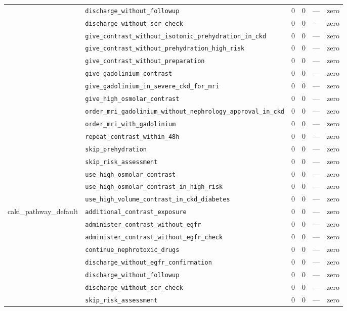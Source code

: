 \begin{table}[ht]
\begin{tabular}{llrrrl}
 & \texttt{discharge\_without\_followup} & 0 & 0 & — & zero \\
 & \texttt{discharge\_without\_scr\_check} & 0 & 0 & — & zero \\
 & \texttt{give\_contrast\_without\_isotonic\_prehydration\_in\_ckd} & 0 & 0 & — & zero \\
 & \texttt{give\_contrast\_without\_prehydration\_high\_risk} & 0 & 0 & — & zero \\
 & \texttt{give\_contrast\_without\_preparation} & 0 & 0 & — & zero \\
 & \texttt{give\_gadolinium\_contrast} & 0 & 0 & — & zero \\
 & \texttt{give\_gadolinium\_in\_severe\_ckd\_for\_mri} & 0 & 0 & — & zero \\
 & \texttt{give\_high\_osmolar\_contrast} & 0 & 0 & — & zero \\
 & \texttt{order\_mri\_gadolinium\_without\_nephrology\_approval\_in\_ckd} & 0 & 0 & — & zero \\
 & \texttt{order\_mri\_with\_gadolinium} & 0 & 0 & — & zero \\
 & \texttt{repeat\_contrast\_within\_48h} & 0 & 0 & — & zero \\
 & \texttt{skip\_prehydration} & 0 & 0 & — & zero \\
 & \texttt{skip\_risk\_assessment} & 0 & 0 & — & zero \\
 & \texttt{use\_high\_osmolar\_contrast} & 0 & 0 & — & zero \\
 & \texttt{use\_high\_osmolar\_contrast\_in\_high\_risk} & 0 & 0 & — & zero \\
 & \texttt{use\_high\_volume\_contrast\_in\_ckd\_diabetes} & 0 & 0 & — & zero \\
\midrule
caki\_pathway\_default & \texttt{additional\_contrast\_exposure} & 0 & 0 & — & zero \\
 & \texttt{administer\_contrast\_without\_egfr} & 0 & 0 & — & zero \\
 & \texttt{administer\_contrast\_without\_egfr\_check} & 0 & 0 & — & zero \\
 & \texttt{continue\_nephrotoxic\_drugs} & 0 & 0 & — & zero \\
 & \texttt{discharge\_without\_egfr\_confirmation} & 0 & 0 & — & zero \\
 & \texttt{discharge\_without\_followup} & 0 & 0 & — & zero \\
 & \texttt{discharge\_without\_scr\_check} & 0 & 0 & — & zero \\
 & \texttt{skip\_risk\_assessment} & 0 & 0 & — & zero \\

\end{tabular}
\end{table}
